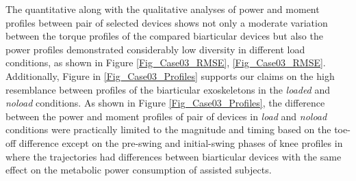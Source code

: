 \documentclass[10pt,letterpaper]{article}
\begin{document}
The quantitative along with the qualitative analyses of power and moment profiles between pair of selected devices shows not only a moderate variation between the torque profiles of the compared biarticular devices but also the power profiles demonstrated considerably low diversity in different load conditions, as shown in Figure \ref{Fig_Case03_RMSE}, \ref{Fig_Case03_RMSE}. Additionally, Figure in \ref{Fig_Case03_Profiles} supports our claims on the high resemblance between profiles of the biarticular exoskeletons in the {\it loaded} and {\it noload} conditions. As shown in Figure \ref{Fig_Case03_Profiles}, the difference between the power and moment profiles of pair of devices in {\it load} and {\it noload} conditions were practically limited to the magnitude and timing based on the toe-off difference except on the pre-swing and initial-swing phases of knee profiles in where the trajectories had differences between biarticular devices with the same effect on the metabolic power consumption of assisted subjects.\\
\end{document}
